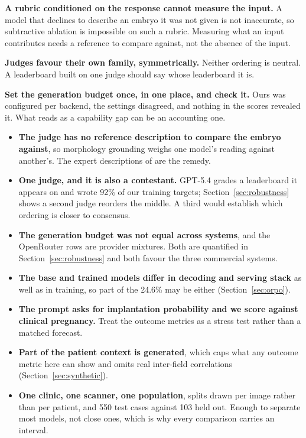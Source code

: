 \textbf{A rubric conditioned on the response cannot measure the input.} A model
that declines to describe an embryo it was not given is not inaccurate, so
subtractive ablation is impossible on such a rubric. Measuring what an input
contributes needs a reference to compare against, not the absence of the input.

\textbf{Judges favour their own family, symmetrically.} Neither ordering is
neutral. A leaderboard built on one judge should say whose leaderboard it is.

\textbf{Set the generation budget once, in one place, and check it.} Ours was
configured per backend, the settings disagreed, and nothing in the scores
revealed it. What reads as a capability gap can be an accounting one.

\begin{itemize}
\item \textbf{The judge has no reference description to compare the embryo
      against}, so morphology grounding weighs one model's reading against
      another's. The expert descriptions of \citet{neu2026dataset} are the
      remedy.
\item \textbf{One judge, and it is also a contestant.} GPT-5.4 grades a
      leaderboard it appears on and wrote 92\% of our training targets;
      Section~\ref{sec:robustness} shows a second judge reorders the middle. A
      third would establish which ordering is closer to consensus.
\item \textbf{The generation budget was not equal across systems}, and the
      OpenRouter rows are provider mixtures. Both are quantified in
      Section~\ref{sec:robustness} and both favour the three commercial systems.
\item \textbf{The base and trained models differ in decoding and serving stack}
      as well as in training, so part of the 24.6\% may be either
      (Section~\ref{sec:orpo}).
\item \textbf{The prompt asks for implantation probability and we score against
      clinical pregnancy.} Treat the outcome metrics as a stress test rather
      than a matched forecast.
\item \textbf{Part of the patient context is generated}, which caps what any
      outcome metric here can show and omits real inter-field correlations
      (Section~\ref{sec:synthetic}).
\item \textbf{One clinic, one scanner, one population}, splits drawn per image
      rather than per patient, and 550 test cases against 103 held out. Enough to
      separate most models, not close ones, which is why every comparison carries
      an interval.
\end{itemize}

